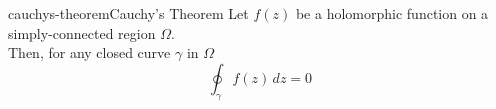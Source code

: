 \documentclass[preview]{standalone}
\begin{document}
\begin{snippetdefinition}{cauchys-theorem}{Cauchy's Theorem}
    Let \(f(z)\) be a holomorphic function on a simply-connected region \(\Omega\). \\
    Then, for any closed curve \(\gamma\) in \(\Omega\)
    \[
        \oint_\gamma f(z) \,dz = 0
    \]
\end{snippetdefinition}

\end{document}
